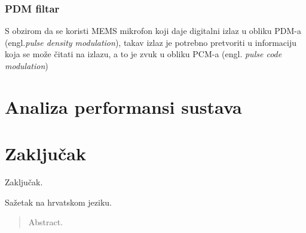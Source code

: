 \documentclass[times, utf8, diplomski]{fer}
\begin{document}
\subsection{PDM filtar}
S obzirom da se koristi MEMS mikrofon koji daje digitalni izlaz u obliku PDM-a (engl.\textit{pulse density modulation}), takav izlaz je potrebno pretvoriti u informaciju koja se može čitati na izlazu, a to je zvuk u obliku PCM-a (engl. \textit{pulse code modulation})

\chapter{Analiza performansi sustava}
\chapter{Zaključak}
Zaključak.




\begin{sazetak}
Sažetak na hrvatskom jeziku.

\end{sazetak}

\begin{abstract}
Abstract.

\end{abstract}
\end{document}
